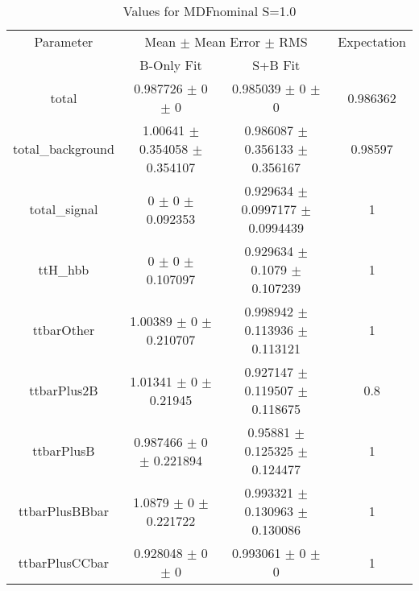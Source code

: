 \begin{table}
\centering
\caption{Values for MDFnominal S=1.0}
\begin{tabular}{cccc}
\toprule
Parameter & \multicolumn{2}{c}{Mean $\pm$ Mean Error $\pm$ RMS} & Expectation\\
 & B-Only Fit & S+B Fit & \\
\midrule
total & \num{0.987726} $\pm$ \num{0} $\pm$ \num{0} & \num{0.985039} $\pm$ \num{0} $\pm$ \num{0} & \num{0.986362}\\
total\_background & \num{1.00641} $\pm$ \num{0.354058} $\pm$ \num{0.354107} & \num{0.986087} $\pm$ \num{0.356133} $\pm$ \num{0.356167} & \num{0.98597}\\
total\_signal & \num{0} $\pm$ \num{0} $\pm$ \num{0.092353} & \num{0.929634} $\pm$ \num{0.0997177} $\pm$ \num{0.0994439} & \num{1}\\
ttH\_hbb & \num{0} $\pm$ \num{0} $\pm$ \num{0.107097} & \num{0.929634} $\pm$ \num{0.1079} $\pm$ \num{0.107239} & \num{1}\\
ttbarOther & \num{1.00389} $\pm$ \num{0} $\pm$ \num{0.210707} & \num{0.998942} $\pm$ \num{0.113936} $\pm$ \num{0.113121} & \num{1}\\
ttbarPlus2B & \num{1.01341} $\pm$ \num{0} $\pm$ \num{0.21945} & \num{0.927147} $\pm$ \num{0.119507} $\pm$ \num{0.118675} & \num{0.8}\\
ttbarPlusB & \num{0.987466} $\pm$ \num{0} $\pm$ \num{0.221894} & \num{0.95881} $\pm$ \num{0.125325} $\pm$ \num{0.124477} & \num{1}\\
ttbarPlusBBbar & \num{1.0879} $\pm$ \num{0} $\pm$ \num{0.221722} & \num{0.993321} $\pm$ \num{0.130963} $\pm$ \num{0.130086} & \num{1}\\
ttbarPlusCCbar & \num{0.928048} $\pm$ \num{0} $\pm$ \num{0} & \num{0.993061} $\pm$ \num{0} $\pm$ \num{0} & \num{1}\\
\bottomrule
\end{tabular}
\end{table}